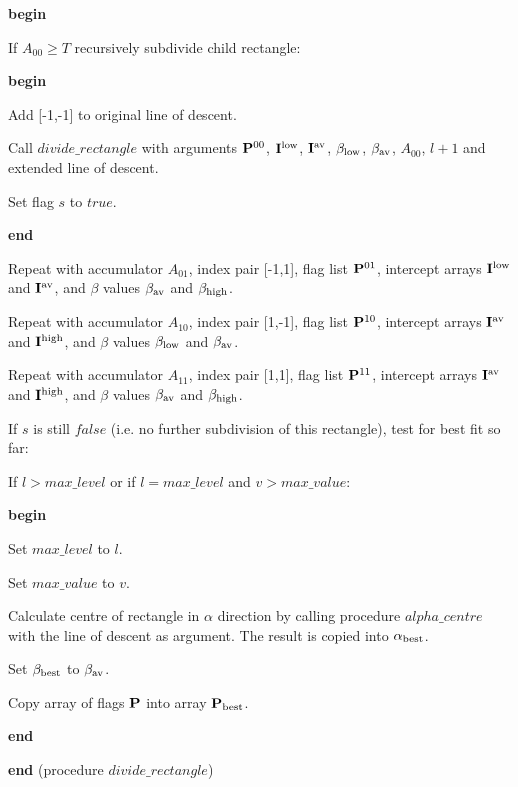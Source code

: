   {\bf begin}
  \begin{indent_para}
   If $A_{00} \geq T$ recursively subdivide child rectangle:

   {\bf begin}
   \begin{indent_para}
    Add [-1,-1] to original line of descent.

    Call $divide\_rectangle$ with arguments ${\bf P}^{00}$,
    ${\bf I}^{\rm low}$, ${\bf I}^{\rm av}$, $\beta_{\rm low}$,
    $\beta_{\rm av}$, $A_{00}$, $l+1$ and extended line of descent.

    Set flag $s$ to $true$.
   \end{indent_para}
   {\bf end}

   Repeat with accumulator $A_{01}$, index pair [-1,1], flag list
   ${\bf P}^{01}$, intercept arrays ${\bf I}^{\rm low}$ and
   ${\bf I}^{\rm av}$, and $\beta$ values $\beta_{\rm av}$ and
   $\beta_{\rm high}$.
   
   Repeat with accumulator $A_{10}$, index pair [1,-1], flag list
   ${\bf P}^{10}$, intercept arrays ${\bf I}^{\rm av}$ and
   ${\bf I}^{\rm high}$, and $\beta$ values $\beta_{\rm low}$ and
   $\beta_{\rm av}$.
   
   Repeat with accumulator $A_{11}$, index pair [1,1], flag list
   ${\bf P}^{11}$, intercept arrays ${\bf I}^{\rm av}$ and
   ${\bf I}^{\rm high}$, and $\beta$ values $\beta_{\rm av}$ and
   $\beta_{\rm high}$.

   If $s$ is still $false$ (i.e. no further
   subdivision of this rectangle), test for best fit so far:

   \begin{indent_para}
    If $l > max\_level$ or if $l = max\_level$ and $v > max\_value$:

    {\bf begin}
    \begin{indent_para}
     Set $max\_level$ to $l$.

     Set $max\_value$ to $v$.

     Calculate centre of rectangle in $\alpha$ direction by calling
     procedure $alpha\_centre$ with the line of descent as argument.
     The result is copied into $\alpha_{\rm best}$.

     Set $\beta_{\rm best}$ to $\beta_{\rm av}$.

     Copy array of flags ${\bf P}$ into array ${\bf P}_{\rm best}$.
    \end{indent_para}
    {\bf end}
   \end{indent_para}
  \end{indent_para}
  {\bf end} (procedure $divide\_rectangle$)

